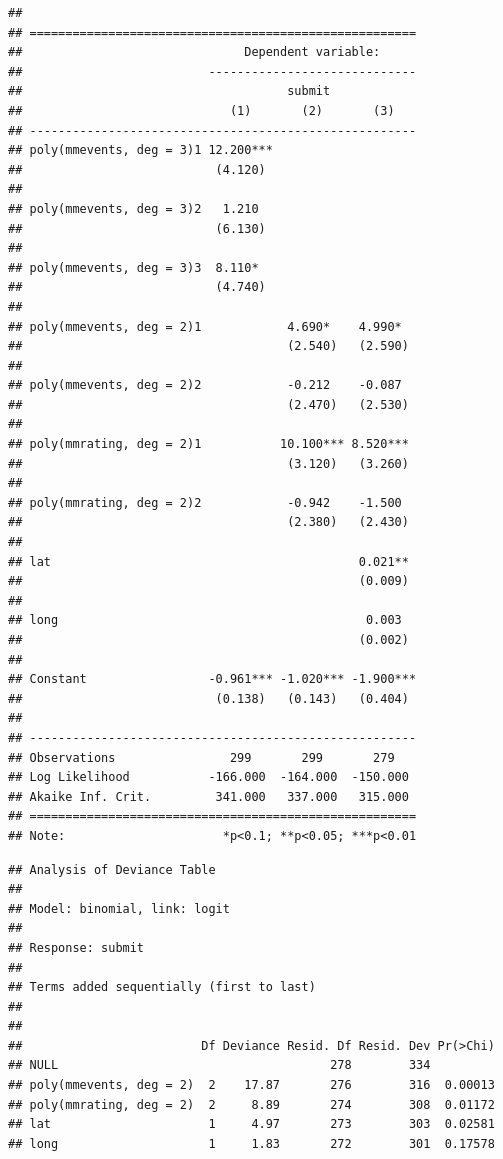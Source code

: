 \documentclass[12pt,]{article}
\begin{document}
\begin{verbatim}
## 
## ======================================================
##                               Dependent variable:     
##                          -----------------------------
##                                     submit            
##                             (1)       (2)       (3)   
## ------------------------------------------------------
## poly(mmevents, deg = 3)1 12.200***                    
##                           (4.120)                     
##                                                       
## poly(mmevents, deg = 3)2   1.210                      
##                           (6.130)                     
##                                                       
## poly(mmevents, deg = 3)3  8.110*                      
##                           (4.740)                     
##                                                       
## poly(mmevents, deg = 2)1            4.690*    4.990*  
##                                     (2.540)   (2.590) 
##                                                       
## poly(mmevents, deg = 2)2            -0.212    -0.087  
##                                     (2.470)   (2.530) 
##                                                       
## poly(mmrating, deg = 2)1           10.100*** 8.520*** 
##                                     (3.120)   (3.260) 
##                                                       
## poly(mmrating, deg = 2)2            -0.942    -1.500  
##                                     (2.380)   (2.430) 
##                                                       
## lat                                           0.021** 
##                                               (0.009) 
##                                                       
## long                                           0.003  
##                                               (0.002) 
##                                                       
## Constant                 -0.961*** -1.020*** -1.900***
##                           (0.138)   (0.143)   (0.404) 
##                                                       
## ------------------------------------------------------
## Observations                299       299       279   
## Log Likelihood           -166.000  -164.000  -150.000 
## Akaike Inf. Crit.         341.000   337.000   315.000 
## ======================================================
## Note:                      *p<0.1; **p<0.05; ***p<0.01
\end{verbatim}

\begin{verbatim}
## Analysis of Deviance Table
## 
## Model: binomial, link: logit
## 
## Response: submit
## 
## Terms added sequentially (first to last)
## 
## 
##                         Df Deviance Resid. Df Resid. Dev Pr(>Chi)
## NULL                                      278        334         
## poly(mmevents, deg = 2)  2    17.87       276        316  0.00013
## poly(mmrating, deg = 2)  2     8.89       274        308  0.01172
## lat                      1     4.97       273        303  0.02581
## long                     1     1.83       272        301  0.17578
\end{verbatim}
\end{document}
